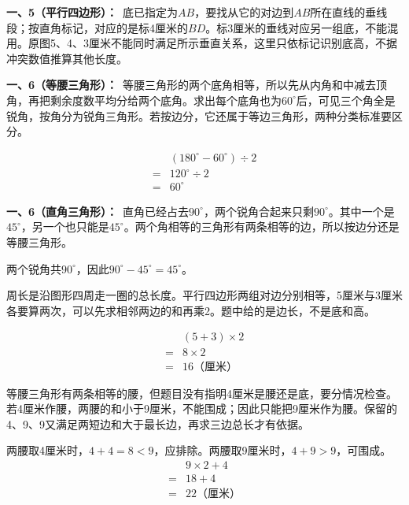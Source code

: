 \documentclass[multi=snippet,border=0pt]{standalone}
\newenvironment{snippet}[3]{\begin{minipage}{#1bp}\color{answerred}\fontsize{#2}{#3}\selectfont\raggedright}{\end{minipage}}
\begin{document}
\begin{snippet}{505}{11.5}{14}\textbf{一、5（平行四边形）：}\ 底已指定为\(AB\)，要找从它的对边到\(AB\)所在直线的垂线段；按直角标记，对应的是标4厘米的\(BD\)。标3厘米的垂线对应另一组底，不能混用。原图5、4、3厘米不能同时满足所示垂直关系，这里只依标记识别底高，不据冲突数值推算其他长度。\end{snippet}
\begin{snippet}{505}{11.5}{14}\textbf{一、6（等腰三角形）：}\ 等腰三角形的两个底角相等，所以先从内角和中减去顶角，再把剩余度数平均分给两个底角。求出每个底角也为\(60^\circ\)后，可见三个角全是锐角，按角分为锐角三角形。若按边分，它还属于等边三角形，两种分类标准要区分。\par \[\begin{aligned}&(180^\circ-60^\circ)\div2\\={}&120^\circ\div2\\={}&60^\circ\end{aligned}\]\end{snippet}
\begin{snippet}{505}{11.5}{14}\textbf{一、6（直角三角形）：}\ 直角已经占去\(90^\circ\)，两个锐角合起来只剩\(90^\circ\)。其中一个是\(45^\circ\)，另一个也只能是\(45^\circ\)。两个角相等的三角形有两条相等的边，所以按边分还是等腰三角形。\par 两个锐角共\(90^\circ\)，因此\(90^\circ-45^\circ=45^\circ\)。\end{snippet}
\begin{snippet}{505}{11.5}{14}周长是沿图形四周走一圈的总长度。平行四边形两组对边分别相等，5厘米与3厘米各要算两次，可以先求相邻两边的和再乘2。题中给的是边长，不是底和高。\par \[\begin{aligned}&(5+3)\times2\\={}&8\times2\\={}&16\text{（厘米）}\end{aligned}\]\end{snippet}
\begin{snippet}{505}{11.5}{14}等腰三角形有两条相等的腰，但题目没有指明4厘米是腰还是底，要分情况检查。若4厘米作腰，两腰的和小于9厘米，不能围成；因此只能把9厘米作为腰。保留的4、9、9又满足两短边和大于最长边，再求三边总长才有依据。\par 两腰取4厘米时，\(4+4=8<9\)，应排除。两腰取9厘米时，\(4+9>9\)，可围成。\[\begin{aligned}&9\times2+4\\={}&18+4\\={}&22\text{（厘米）}\end{aligned}\]\end{snippet}
\end{document}
